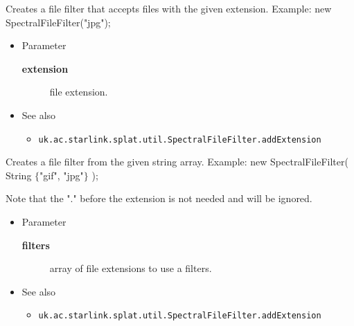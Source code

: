 \begin{desc}Creates a file filter that accepts files with the given extension.
 Example: new SpectralFileFilter("jpg");
\begin{itemize}
\item{Parameter
  \begin{description}
   \item[\textbf{extension}]{file extension.}
  \end{description}}
\end{itemize}
\begin{itemize}
\item{{See also}
  \begin{itemize}
   \item{\texttt{uk.ac.starlink.splat.util.SpectralFileFilter.addExtension} {
}
}
  \end{itemize}
}
\end{itemize}
\end{desc}

\begin{desc}Creates a file filter from the given string array.
 Example: new SpectralFileFilter( String $\{$"gif", "jpg"$\}$ );
 
 Note that the "." before the extension is not needed and will
 be ignored.
\begin{itemize}
\item{Parameter
  \begin{description}
   \item[\textbf{filters}]{array of file extensions to use a filters.}
  \end{description}}
\end{itemize}
\begin{itemize}
\item{{See also}
  \begin{itemize}
   \item{\texttt{uk.ac.starlink.splat.util.SpectralFileFilter.addExtension} {
}
}
  \end{itemize}
}
\end{itemize}
\end{desc}

